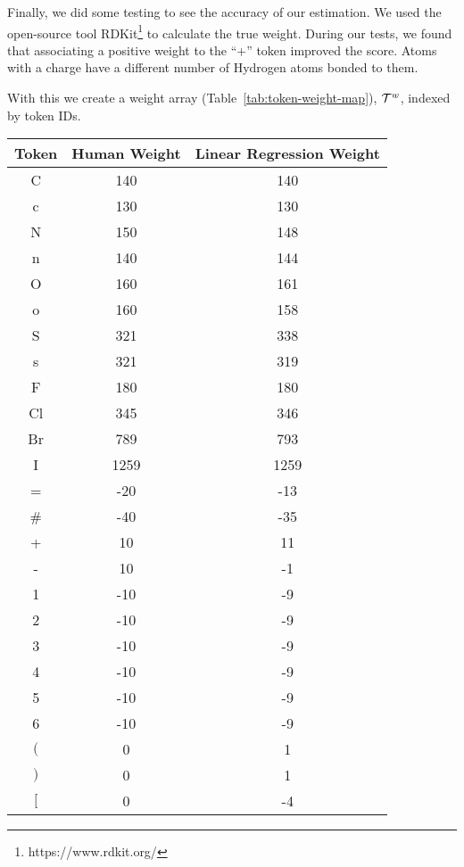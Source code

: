 \documentclass[../Document.tex]{subfiles}
\begin{document}

Finally, we did some testing to see the accuracy of our estimation.
We used the open-source tool RDKit\footnote{https://www.rdkit.org/} to calculate the true weight.
During our tests, we found that associating a positive weight to the ``+'' token improved the score.
Atoms with a charge have a different number of Hydrogen atoms bonded to them.

With this we create a weight array (Table~\ref{tab:token-weight-map}), ${\cal T}^w$,  indexed by token IDs.

\begin{table}[H]
    \centering
    \begin{tabular}{c|c|c}
        Token & Human Weight & Linear Regression Weight\\
        \hline
        C & 140 & 140\\
        c & 130 & 130\\
        N & 150 & 148\\
        n & 140 & 144\\
        O & 160 & 161\\
        o & 160 & 158\\
        S & 321 & 338\\
        s & 321 & 319\\
        F & 180 & 180\\
        Cl & 345 & 346\\
        Br & 789 & 793\\
        I & 1259 & 1259\\
        = & -20 & -13\\
        \# & -40 & -35\\
        + & 10 & 11\\
        - & 10 & -1\\
        1 & -10 & -9\\
        2 & -10 & -9\\
        3 & -10 & -9\\
        4 & -10 & -9\\
        5 & -10 & -9\\
        6 & -10 & -9\\
        $($ & 0 & 1\\
        $)$ & 0 & 1\\
        $[$ & 0 & -4\\

\end{tabular}
\end{table}
\end{document}
